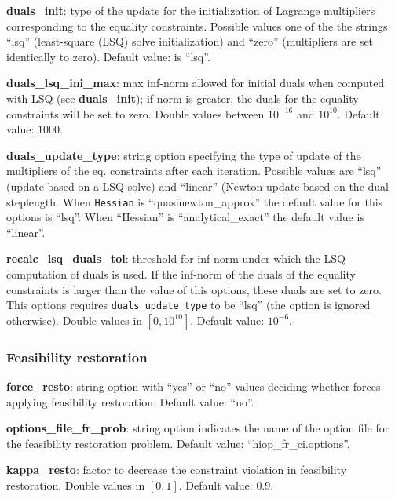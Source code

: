 \noindent \textbf{duals\_init}: type of the update for the initialization of Lagrange multipliers corresponding to the equality constraints. Possible values one of the the strings ``lsq'' (least-square (LSQ) solve initialization) and ``zero'' (multipliers are set identically to zero). Default value: is ``lsq''.
\medskip

\noindent \textbf{duals\_lsq\_ini\_max}: max inf-norm allowed for initial duals when computed with LSQ (see \textbf{duals\_init}); if norm is greater, the duals for the equality constraints will be set to zero. Double values between $10^{-16}$ and $10^{10}$. Default value: $1000$.
\medskip

\noindent \textbf{duals\_update\_type}: string option specifying the type of update of the multipliers of the eq. constraints after each iteration. Possible values are ``lsq'' (update based on a LSQ solve) and ``linear'' (Newton update based on the dual steplength. When \texttt{Hessian} is ``quasinewton\_approx'' the default value for this options is ``lsq''. When ``Hessian'' is ``analytical\_exact'' the default value is ``linear''.
\medskip

\noindent \textbf{recalc\_lsq\_duals\_tol}: threshold for inf-norm under which the LSQ computation of duals is used. If the inf-norm of the duals of the equality constraints is larger than the value of this options, these duals are set to zero. This options requires \texttt{duals\_update\_type} to be ``lsq'' (the option is ignored otherwise). Double values in $[0,10^{10}]$. Default value: $10^{-6}$.
\medskip



\subsubsection{Feasibility restoration}

\noindent \textbf{force\_resto}: string option with ``yes'' or ``no'' values deciding whether \Hi forces applying feasibility restoration. Default value: ``no''.
\medskip

\noindent \textbf{options\_file\_fr\_prob}: string option indicates the name of the option file for the feasibility restoration problem. Default value: ``hiop\_fr\_ci.options''.
\medskip

\noindent \textbf{kappa\_resto}: factor to decrease the constraint violation in feasibility restoration. Double values in $[0, 1]$. Default value: $0.9$.
\medskip



